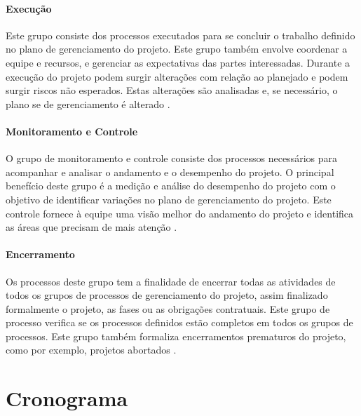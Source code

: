 \documentclass[
    12pt,               %
    openright,          %
    twoside,            %
    a4paper,            %
    chapter=TITLE,     %
    english,            %
    spanish,            %
    portuguese              %
    ]{abntex2}
\begin{document}
\subsubsection{Execução}
Este grupo consiste dos processos executados para se concluir o trabalho definido no plano de gerenciamento do projeto. Este grupo também envolve coordenar a equipe e recursos, e gerenciar as expectativas das partes interessadas. Durante a execução do projeto podem surgir alterações com relação ao planejado e podem surgir riscos não esperados. Estas alterações são analisadas e, se necessário, o plano se de gerenciamento é alterado \cite[p.~55]{pmi2013}.

\subsubsection{Monitoramento e Controle}
O grupo de monitoramento e controle consiste dos processos necessários para acompanhar e analisar o andamento e o desempenho do projeto. O principal benefício deste grupo é a medição e análise do desempenho do projeto com o objetivo de identificar variações no plano de gerenciamento do projeto. Este controle fornece à equipe uma visão melhor do andamento do projeto e identifica as áreas que precisam de mais atenção \cite[p.~55]{pmi2013}.

\subsubsection{Encerramento}
Os processos deste grupo tem a finalidade de encerrar todas as atividades de todos os grupos de processos de gerenciamento do projeto, assim finalizado formalmente o projeto, as fases ou as obrigações contratuais. Este grupo de processo verifica se os processos definidos estão completos em todos os grupos de processos. Este grupo também formaliza encerramentos prematuros do projeto, como por exemplo, projetos abortados \cite[p.~55]{pmi2013}.


	
\chapter{Cronograma}
\end{document}
